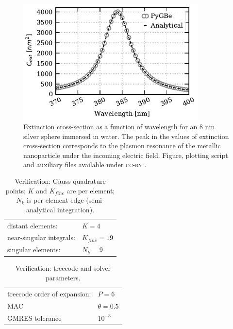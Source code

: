 \begin{figure}%
    \centering
    \includegraphics[width=0.85\textwidth]{silver_NP_verification.pdf} 
    \caption{Extinction cross-section as a function of wavelength for an $8$ nm
             silver sphere immersed in water. The peak in the values of 
             extinction cross-section corresponds to the plasmon resonance of the metallic 
             nanoparticle under the incoming electric field. Figure, plotting script and 
             auxiliary files available under \textsc{cc-by} \cite{ClementiETal2018d}.}
    \label{fig:verif_sph}
 \end{figure}

\begin{table}%
    \centering
    \caption{\label{table:quadparams2} Verification: Gauss quadrature points; 
    $K$ and $K_{fine}$ are per element; $N_k $ is per element edge (semi-analytical integration). } 
    \begin{tabular}{l l}
    \hline%
     distant elements: & $K=4$ \\
     near-singular integrals:   & $ K_{fine}=19$ \\
     singular elements:  & $N_k =9$ \\
    \hline%
    \end{tabular}
\end{table}


\begin{table}%
    \centering
    \caption{\label{table:treeparams2} Verification: treecode and solver parameters.} 
    \begin{tabular}{l l}
    \hline%
    treecode order of expansion: & $P=6$\\
    MAC                                         & $\theta=0.5$\\
    GMRES tolerance                    & $10^{-3}$\\
    \hline%
    \end{tabular}
\end{table}

